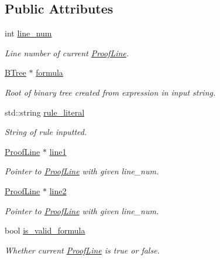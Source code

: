 \subsection*{Public Attributes}
\begin{DoxyCompactItemize}
\item 
int \mbox{\hyperlink{classProofLine_af1e2b73ad5275235028a4b131e574aa7}{line\+\_\+num}}
\begin{DoxyCompactList}\small\item\em Line number of current \mbox{\hyperlink{classProofLine}{Proof\+Line}}. \end{DoxyCompactList}\item 
\mbox{\hyperlink{classBTree}{B\+Tree}} $\ast$ \mbox{\hyperlink{classProofLine_ac9dee0241ef4f6371135098fd5b1a66d}{formula}}
\begin{DoxyCompactList}\small\item\em Root of binary tree created from expression in input string. \end{DoxyCompactList}\item 
std\+::string \mbox{\hyperlink{classProofLine_acdc39e9e092a10ba3a6124f21c0eb420}{rule\+\_\+literal}}
\begin{DoxyCompactList}\small\item\em String of rule inputted. \end{DoxyCompactList}\item 
\mbox{\hyperlink{classProofLine}{Proof\+Line}} $\ast$ \mbox{\hyperlink{classProofLine_a7dbdcf0ea65aed377c5ac03303b474a6}{line1}}
\begin{DoxyCompactList}\small\item\em Pointer to \mbox{\hyperlink{classProofLine}{Proof\+Line}} with given line\+\_\+num. \end{DoxyCompactList}\item 
\mbox{\hyperlink{classProofLine}{Proof\+Line}} $\ast$ \mbox{\hyperlink{classProofLine_afed6bbbe21b20cdbde9398eb73ccf15f}{line2}}
\begin{DoxyCompactList}\small\item\em Pointer to \mbox{\hyperlink{classProofLine}{Proof\+Line}} with given line\+\_\+num. \end{DoxyCompactList}\item 
bool \mbox{\hyperlink{classProofLine_a8531e674967263c2e6ba67d8bf12a336}{is\+\_\+valid\+\_\+formula}}
\begin{DoxyCompactList}\small\item\em Whether current \mbox{\hyperlink{classProofLine}{Proof\+Line}} is true or false. \end{DoxyCompactList}\end{DoxyCompactItemize}
